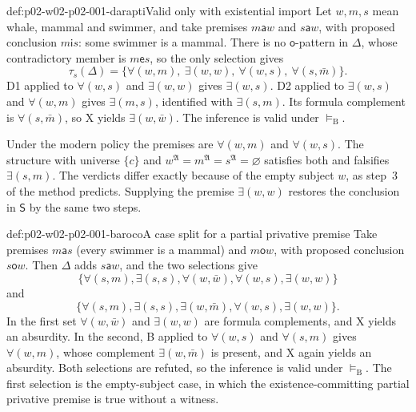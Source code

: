 \begin{hbexample}{def:p02-w02-p02-001-darapti}{Valid only with existential import}
Let \(w,m,s\) mean whale, mammal and swimmer, and take premises
\(m\mathbin{\mathsf a}w\) and \(s\mathbin{\mathsf a}w\), with proposed
conclusion \(m\mathbin{\mathsf i}s\): some swimmer is a mammal.
There is no \(\mathsf o\)-pattern in \(\Delta\), whose contradictory member
is \(m\mathbin{\mathsf e}s\), so the only selection gives
\[
 \tau_s(\Delta)=\{\forall(w,m),\ \exists(w,w),\ \forall(w,s),\ \forall(s,\bar m)\}.
\]
D1 applied to \(\forall(w,s)\) and \(\exists(w,w)\) gives
\(\exists(w,s)\). D2 applied to \(\exists(w,s)\) and \(\forall(w,m)\) gives
\(\exists(m,s)\), identified with \(\exists(s,m)\). Its formula complement
is \(\forall(s,\bar m)\), so X yields \(\exists(w,\bar w)\). The inference
is valid under \(\models_{\mathrm B}\).

Under the modern policy the premises are \(\forall(w,m)\) and
\(\forall(w,s)\). The structure with universe \(\{c\}\) and
\(w^{\mathfrak A}=m^{\mathfrak A}=s^{\mathfrak A}=\varnothing\) satisfies
both and falsifies \(\exists(s,m)\). The verdicts differ exactly because
of the empty subject \(w\), as step~3 of the method predicts. Supplying the
premise \(\exists(w,w)\) restores the conclusion in \(\mathsf S\) by the
same two steps.
\end{hbexample}

\begin{hbexample}{def:p02-w02-p02-001-baroco}{A case split for a partial privative premise}
Take premises \(m\mathbin{\mathsf a}s\) (every swimmer is a mammal) and
\(m\mathbin{\mathsf o}w\), with proposed conclusion
\(s\mathbin{\mathsf o}w\). Then \(\Delta\) adds \(s\mathbin{\mathsf a}w\),
and the two selections give
\[
 \{\forall(s,m),\exists(s,s),\forall(w,\bar w),\forall(w,s),\exists(w,w)\}
\]
and
\[
 \{\forall(s,m),\exists(s,s),\exists(w,\bar m),\forall(w,s),\exists(w,w)\}.
\]
In the first set \(\forall(w,\bar w)\) and \(\exists(w,w)\) are formula
complements, and X yields an absurdity. In the second, B applied to
\(\forall(w,s)\) and \(\forall(s,m)\) gives \(\forall(w,m)\), whose
complement \(\exists(w,\bar m)\) is present, and X again yields an
absurdity. Both selections are refuted, so the inference is valid under
\(\models_{\mathrm B}\). The first selection is the empty-subject case, in
which the existence-committing partial privative premise is true without a
witness.
\end{hbexample}

